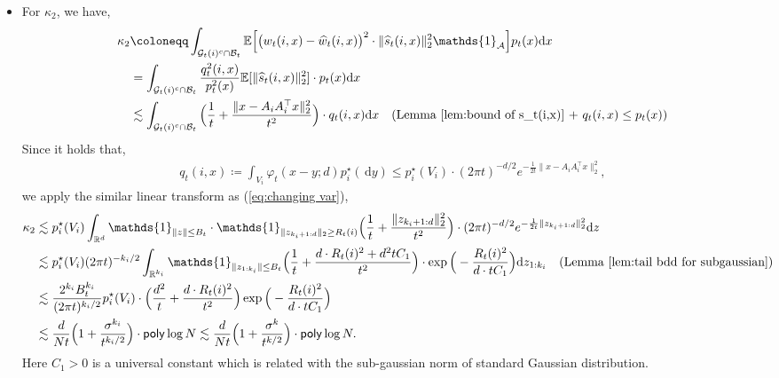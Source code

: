 \documentclass{article}
\newcommand{\ind}{\mathds{1}}
\newcommand{\defn}{\coloneqq}
\newcommand{\diff}{\,\mathrm{d}}
\newcommand{\polylog}{\mathsf{poly}\log}
\theoremstyle{plain}
\theoremstyle{remark}
\begin{document}
\begin{itemize}
    \item For $\kappa_2$, we have, 
    \begin{align*}
        \kappa_2 &\defn \int_{\mathcal{G}_t(i)^c \cap \mathcal{B}_t} \mathbb{E} \Big[  \big(w_t(i,x)-\widehat{w}_t(i,x)\big)^2 \cdot \|\widehat{s}_t(i,x) \|_2^2 \ind_{\mathcal{A}}\Big] p_t(x) \!\diff x \\
        & = \int_{\mathcal{G}_t(i)^c \cap \mathcal{B}_t} \frac{q_t^2(i,x)}{p_t^2(x)} \mathbb{E} [\|\widehat{s}_t(i,x) \|_2^2] \cdot p_t(x)\!\diff x \\
        &\lesssim \int_{\mathcal{G}_t(i)^c \cap \mathcal{B}_t} \Big( \frac{1}{t} + \frac{\|x-A_iA_i^{\top}x\|_2^2}{t^2}\Big) \cdot q_t(i,x) \!\diff x \quad (\text{Lemma \ref{lem:bound of s_t(i,x)} + } q_t(i,x) \leq p_t(x)) 
    \end{align*}
    Since it holds that, 
    \begin{align*}
        q_t(i,x) \defn \int_{V_i} \varphi_t(x-y;d) p_i^\star(\!\diff y) \leq  p_i^\star(V_i)\cdot (2\pi t)^{-d/2} e^{-\frac{1}{2t}\|x-A_iA_i^{\top}x\|_2^2},
    \end{align*}
    we apply the similar linear transform as (\ref{eq:changing var}), 
    \begin{align*}
        \kappa_2 &\lesssim p_i^\star(V_i)\int_{\mathbb{R}^d} \ind_{ \|z\|\leq B_t} \cdot \ind_{\| z_{k_i+1:d}\|_2\geq R_t(i)} \Big( \frac{1}{t} + \frac{\| z_{k_i+1:d}\|_2^2}{t^2}\Big) \cdot (2\pi t)^{-d/2}e^{-\frac{1}{2t} \|z_{k_i+1:d}\|_2^2} \!\diff z \\
        &\lesssim p_i^\star(V_i) (2\pi t)^{-k_i/2} \int_{\mathbb{R}^{k_i}} \ind_{\| z_{1:k_i}\|\leq B_t} \Big( \frac{1}{t} + \frac{d\cdot R_t(i)^2 + d^2tC_1}{t^2}\Big) \cdot \exp \Big( -\frac{R_t(i)^2}{d\cdot tC_1}\Big)  \!\diff z_{1:k_i} \quad (\text{Lemma \ref{lem:tail bdd for subgaussian}})\\
        &\lesssim \frac{2^{k_i} B_t^{k_i}}{(2\pi t)^{k_i/2}} p_i^\star(V_i)\cdot \Big( \frac{d^2}{t} + \frac{d\cdot R_t(i)^2}{t^2}\Big)  \exp \Big( -\frac{R_t(i)^2}{d\cdot tC_1}\Big)  \\
        &\lesssim \frac{d}{Nt}\Big( 1+\frac{\sigma^{k_i}}{t^{k_i/2}}\Big)\cdot \polylog N \lesssim \frac{d}{Nt}\Big( 1+\frac{\sigma^{k}}{t^{k/2}}\Big)\cdot \polylog N. 
    \end{align*}
    Here $C_1>0$ is a universal constant which is related with the sub-gaussian norm of standard Gaussian distribution. 


\end{itemize}
\end{document}
